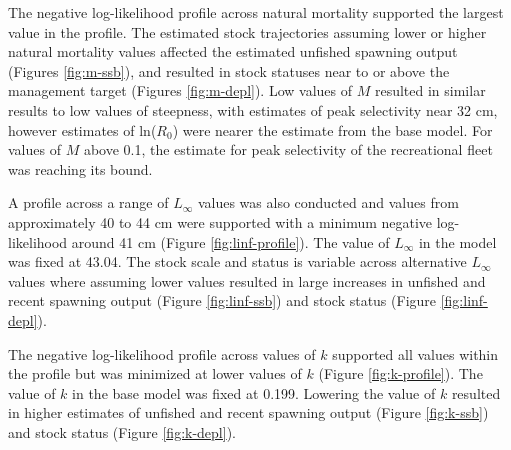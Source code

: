 \documentclass[11pt,
  english,
  a4paper,
]{article}
\begin{document}
\leavevmode\tagmcend\tagstructend\par


The negative log-likelihood profile across natural mortality supported the largest value in the profile. The estimated stock trajectories assuming lower or higher natural mortality values affected the estimated unfished spawning output (Figures \ref{fig:m-ssb}), and resulted in stock statuses near to or above the management target (Figures \ref{fig:m-depl}). Low values of {\(M\)\leavevmode\tagmcend\tagstructend} resulted in similar results to low values of steepness, with estimates of peak selectivity near 32 cm, however estimates of ln({\(R_0\)\leavevmode\tagmcend\tagstructend}) were nearer the estimate from the base model. For values of {\(M\)\leavevmode\tagmcend\tagstructend} above 0.1, the estimate for peak selectivity of the recreational fleet was reaching its bound.

\leavevmode\tagmcend\tagstructend\par


A profile across a range of {\(L_{\infty}\)\leavevmode\tagmcend\tagstructend} values was also conducted and values from approximately 40 to 44 cm were supported with a minimum negative log-likelihood around 41 cm (Figure \ref{fig:linf-profile}). The value of {\(L_{\infty}\)\leavevmode\tagmcend\tagstructend} in the model was fixed at 43.04. The stock scale and status is variable across alternative {\(L_{\infty}\)\leavevmode\tagmcend\tagstructend} values where assuming lower values resulted in large increases in unfished and recent spawning output (Figure \ref{fig:linf-ssb}) and stock status (Figure \ref{fig:linf-depl}).

\leavevmode\tagmcend\tagstructend\par


The negative log-likelihood profile across values of {\(k\)\leavevmode\tagmcend\tagstructend} supported all values within the profile but was minimized at lower values of {\(k\)\leavevmode\tagmcend\tagstructend} (Figure \ref{fig:k-profile}). The value of {\(k\)\leavevmode\tagmcend\tagstructend} in the base model was fixed at 0.199. Lowering the value of {\(k\)\leavevmode\tagmcend\tagstructend} resulted in higher estimates of unfished and recent spawning output (Figure \ref{fig:k-ssb}) and stock status (Figure \ref{fig:k-depl}).
\end{document}
